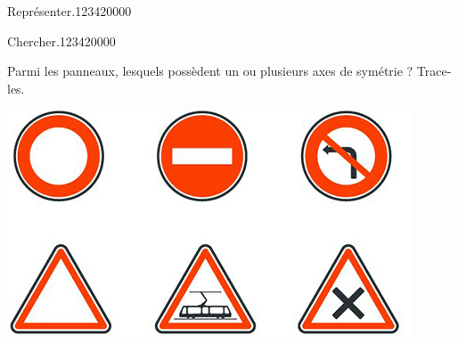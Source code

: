 \begin{pageAD}
\begin{ExoCad}{Représenter.}{1234}{2}{0}{0}{0}{0}
\end{ExoCad}
\begin{ExoCad}{Chercher.}{1234}{2}{0}{0}{0}{0}

 
 Parmi les panneaux, lesquels possèdent un ou plusieurs axes de symétrie ? Trace-les.
 
\begin{center}
 \includegraphics[scale=0.65]{FIG/panneaux3.jpg} 
 
\end{center}
\end{ExoCad}
 
\end{pageAD}



